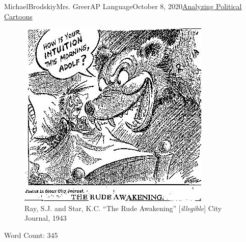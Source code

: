 \documentclass[12pt,letterpaper]{article}
\begin{document}
\begin{mla}{Michael}{Brodskiy}{Mrs. Greer}{AP Language}{October 8, 2020}{\underline{Analyzing Political Cartoons}}
\begin{justifying}
    \begin{figure}[h]
      \centering
      \includegraphics[width=.6\textwidth]{../Figures/Stalingrad.jpg}
      \caption{Ray, S.J. and Star, K.C. ``The Rude Awakening'' [\textit{illegible}] City Journal, 1943}
      \label{fig:1}
    \end{figure}


\end{justifying}
\centering Word Count: 345

\end{mla}
\end{document}
